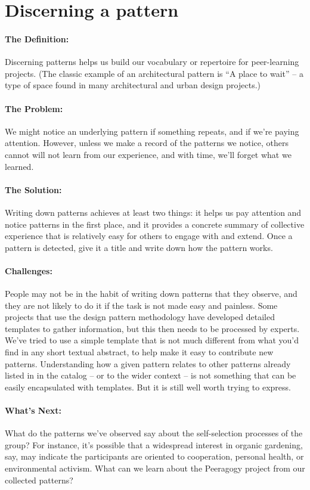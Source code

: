 \section{Discerning a pattern}
\paragraph{The Definition:} Discerning patterns helps us build our
vocabulary or repertoire for peer-learning projects. (The classic
example of an architectural pattern is ``A place to wait'' -- a type of
space found in many architectural and urban design projects.)

\paragraph{The Problem:} We might notice an underlying pattern if something
repeats, and if we're paying attention. However, unless we make a record
of the patterns we notice, others cannot will not learn from our
experience, and with time, we'll forget what we learned.

\paragraph{The Solution:} Writing down patterns achieves at least two
things: it helps us pay attention and notice patterns in the first
place, and it provides a concrete summary of collective experience that
is relatively easy for others to engage with and extend. Once a pattern
is detected, give it a title and write down how the pattern works.

\paragraph{Challenges:} People may not be in the habit of writing down
patterns that they observe, and they are not likely to do it if the task
is not made easy and painless. Some projects that use the design pattern
methodology have developed detailed templates to gather information, but
this then needs to be processed by experts. We've tried to use a simple
template that is not much different from what you'd find in any short
textual abstract, to help make it easy to contribute new patterns.
Understanding how a given pattern relates to other patterns already
listed in in the catalog -- or to the wider context -- is not something
that can be easily encapsulated with templates. But it is still well
worth trying to express.

\paragraph{What's Next:} What do the patterns we've observed say about the
self-selection processes of the group? For instance, it's possible that
a widespread interest in organic gardening, say, may indicate the
participants are oriented to cooperation, personal health, or
environmental activism. What can we learn about the Peeragogy project
from our collected patterns?
